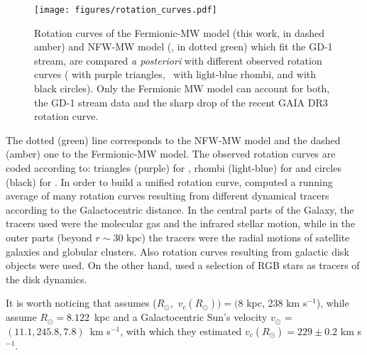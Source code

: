 \documentclass[twocolumn]{aa}
\begin{document}
\begin{figure}
   \centering
   \texttt{[image: figures/rotation\_curves.pdf]}
   \caption{Rotation curves of the Fermionic-MW model (this work, in dashed amber) and NFW-MW model (\cite{2019MNRAS.486.2995M}, in dotted green) which fit the GD-1 stream, are compared \textit{a posteriori} with different observed rotation curves (\citealp{Eilers_2019} with purple triangles,~\citealp{sofue_2020} with light-blue rhombi, and \citealp{Jiao2023} with black circles). Only the Fermionic MW model can account for both, the GD-1 stream data and the sharp drop of the recent GAIA DR3 rotation curve.}
   \label{fig:rotcurve}
\end{figure}

The dotted (green) line corresponds to the NFW-MW model and the dashed (amber) one to the Fermionic-MW model.
The observed rotation curves are coded according to: triangles (purple)
for \citet{Eilers_2019}, rhombi (light-blue) for \citet{sofue_2020} and
circles (black) for \citet{Jiao2023}.
In order to build a unified rotation curve, \citet{sofue_2020} computed a running average of many rotation curves resulting from different dynamical tracers according to the Galactocentric distance. In the central parts of the Galaxy, the tracers used were the molecular gas and the infrared stellar motion, while in the outer parts (beyond $r\sim30 \textrm{~kpc}$) the tracers were the radial motions of satellite galaxies and globular clusters. Also rotation curves resulting from galactic disk objects were used.
On the other hand, \citet{Eilers_2019} used a selection of RGB stars as tracers of the disk dynamics.

It is worth noticing  that \citet{sofue_2020} assumes
($R_\odot$,~$v_c(R_\odot))=(8$ kpc, 238 km s$^{-1}$), while \citet{Eilers_2019}
assume $R_\odot=8.122$~kpc and a Galactocentric Sun's velocity $v_\odot$ = $(11.1, 245.8, 7.8)$~km s$^{-1}$,
with which they estimated $v_c(R_\odot)=229\pm0.2$ km s$^{-1}$.
\end{document}
